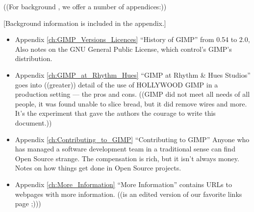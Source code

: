 ((For background , we offer a number of appendices:))

[Background information is included in the appendix.] 

\begin{itemize}

\item Appendix  \ref{ch:GIMP_Versions_Licences} ``History of GIMP'' from
0.54 to 2.0, Also notes on the GNU General Public License, which
control's GIMP's distribution.

\item Appendix  \ref{ch:GIMP_at_Rhythm_Hues}  ``GIMP at Rhythm \& Hues Studios''
goes into ((greater)) detail of the use of HOLLYWOOD GIMP in a production
setting --- the pros and cons. ((GIMP did not meet all needs of all people, it was found unable to
slice bread, but it did remove wires and more. It's the experiment that gave the 
authors the courage to write this document.))

\item Appendix \ref{ch:Contributing_to_GIMP} ``Contributing to GIMP''
Anyone who has managed a software development team in a traditional sense
can find Open Source strange. The compensation is rich, but it isn't always
money. Notes on how things get done in Open Source projects.

\item Appendix \ref{ch:More_Information} ``More Information'' contains URLs to
webpages with more information.
((is an
edited version of our favorite links page ;))) 

\end{itemize}


